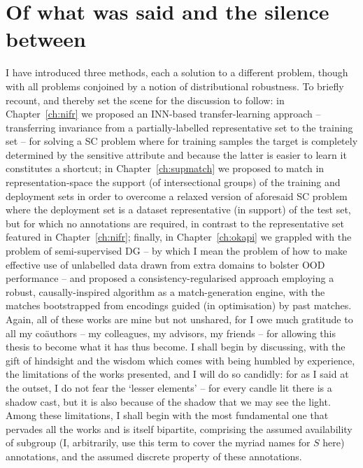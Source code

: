 \section*{Of what was said and the silence between}\label{sec:what-was-said}
%
I have introduced three methods, each a solution to a different problem, though with all problems
conjoined by a notion of distributional robustness.
%
%
To briefly recount, and thereby set the scene for the discussion to follow: in
Chapter~\ref{ch:nifr} we proposed an \ac{INN}-based transfer-learning approach -- transferring
invariance from a partially-labelled representative set to the training set -- for solving a
\ac{SC} problem where for training samples the target is completely determined by the
sensitive attribute and because the latter is easier to learn it constitutes a shortcut;
%
in Chapter~\ref{ch:supmatch} we proposed to match in representation-space the support (of
intersectional groups) of the training and deployment sets in order to overcome a relaxed version
of aforesaid \ac{SC} problem where the deployment set is a dataset representative (in support) of
the test set, but for which no annotations are required, in contrast to the representative set
featured in Chapter~\ref{ch:nifr};
%
finally, in Chapter~\ref{ch:okapi} we grappled with the problem of semi-supervised \ac{DG} -- by
which I mean the problem of how to make effective use of unlabelled data drawn from extra domains
to bolster \ac{OOD} performance -- and proposed a consistency-regularised approach employing a
robust, causally-inspired algorithm as a match-generation engine, with the matches bootstrapped
from encodings guided (in optimisation) by past matches.
%
Again, all of these works are mine but not unshared, for I owe much gratitude to all my
co{\"a}uthors -- my colleagues, my advisors, my friends -- for allowing this thesis to become what
it has thus become.
%
%
I shall begin by discussing, with the gift of hindsight and the wisdom which comes with being
humbled by experience, the limitations of the works presented, and I will do so candidly: for as I
said at the outset, I do not fear the `lesser elements' -- for every candle lit there is a shadow
cast, but it is also because of the shadow that we may see the light.
%
Among these limitations, I shall begin with the most fundamental one that pervades all the works
and is itself bipartite, comprising the assumed availability of subgroup (I, arbitrarily, use this
term to cover the myriad names for \(S\) here) annotations, and the assumed discrete property of
these annotations.

